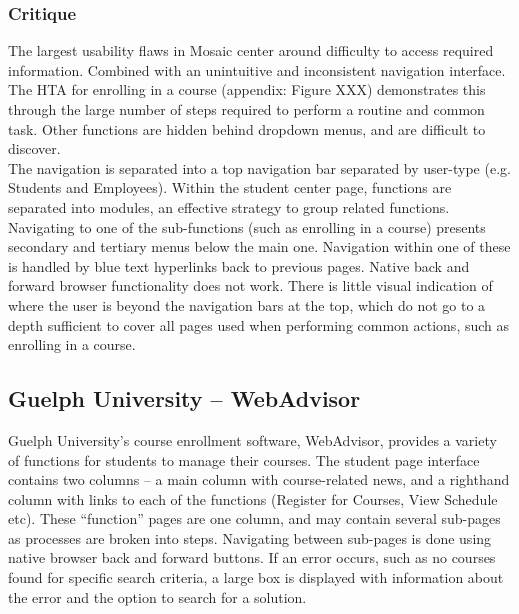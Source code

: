 \documentclass[10pt]{article}
\begin{document}
\begin{multicols}{2}
\subsubsection*{Critique}
The largest usability flaws in Mosaic center around difficulty to access 
required information. Combined with an unintuitive and inconsistent navigation 
interface. The HTA for enrolling in a course (appendix: Figure XXX) demonstrates this 
through the large number of steps required to perform a routine and common task. 
Other functions are hidden behind dropdown menus, and are difficult to discover.\\

The navigation is separated into a top navigation bar separated by user-type 
(e.g. Students and Employees). Within the student center page, functions are 
separated into modules, an effective strategy to group related functions. 
Navigating to one of the sub-functions (such as enrolling in a course) presents 
secondary and tertiary menus below the main one. Navigation within one of these 
is handled by blue text hyperlinks back to previous pages. Native back and 
forward browser functionality does not work. There is little visual indication 
of where the user is beyond the navigation bars at the top, which do not go to a 
depth sufficient to cover all pages used when performing common actions, such as 
enrolling in a course.

\subsection*{Guelph University -- WebAdvisor}
Guelph University's course enrollment software, WebAdvisor, provides a variety 
of functions for students to manage their courses. The student page interface 
contains two columns -- a main column with course-related news, and a righthand 
column with links to each of the functions (Register for Courses, View Schedule 
etc). These ``function'' pages are one column, and may contain several sub-pages 
as processes are broken into steps. Navigating between sub-pages is done using 
native browser back and forward buttons. If an error occurs, such as no courses 
found for specific search criteria, a large box is displayed with information 
about the error and the option to search for a solution.


\end{multicols}
\end{document}
